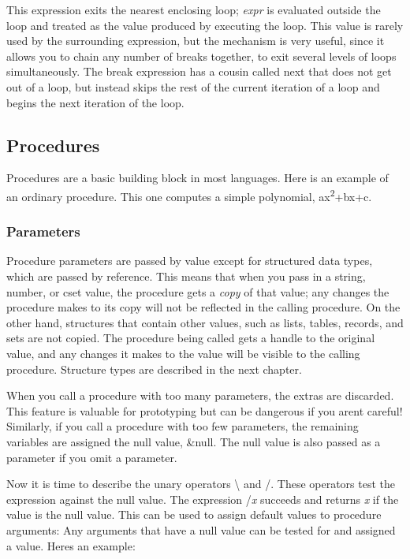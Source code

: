 This expression exits the nearest enclosing loop; \textsf{\textit{expr}}
is evaluated outside the loop and treated as the value produced by
executing the loop. This value is rarely used by the surrounding
expression, but the mechanism is very useful, since it allows you to
chain any number of breaks together, to exit several levels of loops
simultaneously. The \textsf{break} expression has a cousin called
\textsf{next} that does not get out of a loop, but instead skips the
rest of the current iteration of a loop and begins the next iteration
of the loop.

\subsection[Procedures]{Procedures}
Procedures are a basic building block in most
languages. Here is an example of an ordinary procedure. This one
computes a simple polynomial, ax\textsuperscript{2}+bx+c.


\subsubsection{Parameters}
Procedure parameters are passed by value except for
structured data types, which are passed by
reference. This means that when you pass in a string,
number, or cset value, the procedure gets a \textit{copy} of that
value; any changes the procedure makes to its copy will not be
reflected in the calling procedure. On the other hand, structures that
contain other values, such as lists, tables, records, and sets are not
copied. The procedure being called gets a handle to the original value,
and any changes it makes to the value will be visible to the calling
procedure. Structure types are described in the next chapter.

When you call a procedure with too many
parameters, the extras are discarded. This feature is valuable for
prototyping but can be dangerous if you aren{\textquotesingle}t
careful! Similarly, if you call a procedure with too few parameters,
the remaining variables are assigned the null value, \textsf{\&null}.
The null value is also passed as a parameter if you omit a parameter.

Now it is time to describe the unary operators \textsf{{\textbackslash}}
and \textsf{/}. These operators test the expression against the null
value. The expression \textsf{/}\textsf{\textit{x}}
succeeds and returns \textsf{\textit{x}} if the value is the null
value. This can be used to assign default values to procedure
arguments: Any arguments that have a null value can be tested for and
assigned a value. Here{\textquotesingle}s an example:


